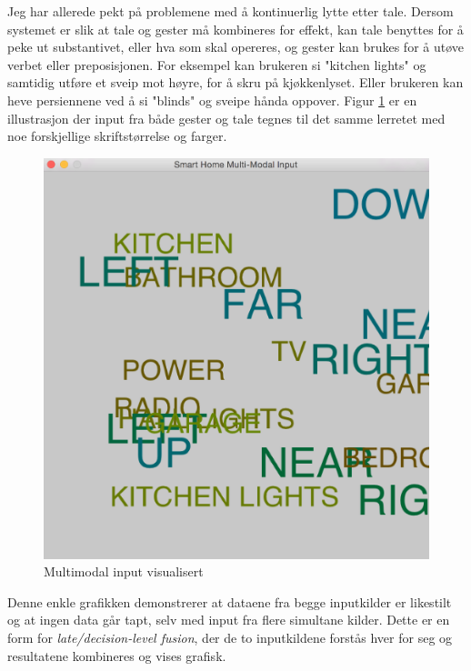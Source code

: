 Jeg har allerede pekt på problemene med å kontinuerlig lytte etter tale. Dersom systemet er slik at tale og gester må kombineres for effekt, kan tale benyttes for å peke ut substantivet, eller hva som skal opereres, og gester kan brukes for å utøve verbet eller preposisjonen. For eksempel kan brukeren si "kitchen lights" og samtidig utføre et sveip mot høyre, for å skru på kjøkkenlyset. Eller brukeren kan heve persiennene ved å si "blinds" og sveipe hånda oppover. Figur \ref{fig:multimodalvisualisert} er en illustrasjon der input fra både gester og tale tegnes til det samme lerretet med noe forskjellige skriftstørrelse og farger.
\begin{figure}
\centering
\includegraphics[scale=0.2]{fig/screenshot_project2}
\caption{Multimodal input visualisert}
\label{fig:multimodalvisualisert}
\end{figure}
Denne enkle grafikken demonstrerer at dataene fra begge inputkilder er likestilt og at ingen data går tapt, selv med input fra flere simultane kilder. Dette er en form for \emph{late/decision-level fusion}, der de to inputkildene forstås hver for seg og resultatene kombineres og vises grafisk.\\

